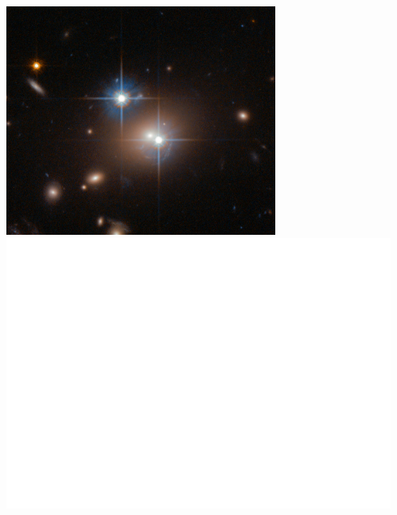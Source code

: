 \documentclass{beamer}
\begin{document}
{\begin{columns}
\begin{column}{0.5\textwidth}
\begin{itemize}
            \end{itemize}
        \end{column}
        \begin{column}{0.5\textwidth}
            \begin{center}
                \includegraphics[width=0.7\textwidth]{QSO_B0957+0561-crop.jpg}
                \newline
                \includegraphics[width=\textwidth]{lens_geometry_invert.pdf}
            \end{center}

            
        \end{column}
    \end{columns}


}
\end{document}

